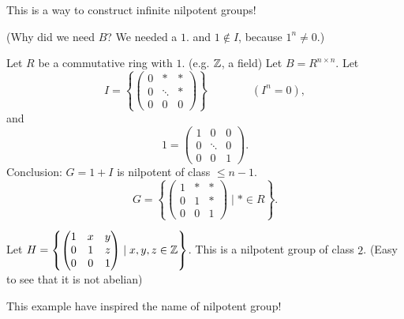 This is a way to construct infinite nilpotent groups!

(Why did we need $B$? We needed a $1$. and $1 \not\in I$, because $1 ^{n} \neq 0$.)

\begin{eg}
    Let $R$ be a commutative ring with $1$. (e.g. $ \mathbb{Z}$, a field)
    Let $B = R^{n \times n}$.
    Let
    \[
    I = \left\{
        \begin{pmatrix}
            0 & * & *\\
            0 & \ddots & *\\
            0 & 0 & 0
        \end{pmatrix}
    \right\}  \qquad \qquad (I^{n} = 0)
    ,\] 
    and
    \[
    1 = \begin{pmatrix}
        1 & 0 & 0\\
        0 & \ddots & 0\\
        0 & 0 & 1
    \end{pmatrix}
    .\] 
    Conclusion: $ G = 1 + I $ is nilpotent of class $\le n-1$.
    \[
    G = \left\{
        \begin{pmatrix}
            1 & * & *\\
            0 & 1 & *\\
            0 & 0 & 1
        \end{pmatrix}  \mid * \in R
    \right\} 
    .\] 
\end{eg}

\begin{eg}
    Let $H = \left\{\begin{pmatrix}
        1 & x & y\\
        0 & 1 & z\\
        0 & 0 & 1
    \end{pmatrix}  \mid  x, y, z \in \mathbb{Z}\right\} $.
    This is a nilpotent group of class $2$. (Easy to see that it is not abelian)
\end{eg}

This example have inspired the name of nilpotent group!
